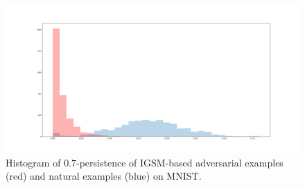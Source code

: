 \begin{figure}[!ht]
\centering
\includegraphics[trim=200 80 100 100, clip,width=.5\textwidth]{c3_figures/original_hist.png}
\caption{Histogram of $0.7$-persistence of IGSM-based adversarial examples (red) and natural examples (blue) on MNIST. %
}
\label{fig:IGSMpersistenceMNIST}
\end{figure}


